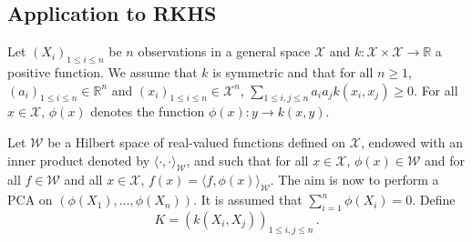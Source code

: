 \documentclass[a4paper,10pt,fleqn]{article}
\newcommand{\eqsp}{\,}
\newcommand{\rset}{\ensuremath{\mathbb{R}}}
\newcommand{\W}{\ensuremath{\mathcal{W}}}
\newcommand{\X}{\ensuremath{\mathcal{X}}}
\newcommand{\1}{\ensuremath{\mathbbm{1}}}
\newcommand{\bfK}{K}
\begin{document}
\subsection*{Application to RKHS}
Let $(X_i)_{1\le i \le n}$ be $n$ observations in a general space $\X$ and $k: \X\times \X \to \rset$ a positive function. We assume that $k$ is symmetric and that for all $n\geqslant 1$, $(a_i)_{1\leqslant i \leqslant n}\in\rset^n$ and $(x_i)_{1\leqslant i \leqslant n}\in\X^n$, $\sum_{1\leqslant i,j \leqslant n}a_ia_j k(x_i,x_j)\geqslant 0$.  For all $x\in\X$, $\phi(x)$ denotes the function $\phi(x): y\to k(x,y)$.

Let $\W$ be a Hilbert space of real-valued functions defined on $\X$, endowed with an inner product denoted by $\langle \cdot,\cdot \rangle_{\W}$, and such that for all $x\in\X$, $\phi(x)\in\W$ and for all $f\in \W$ and all $x\in\X$, $f(x) = \langle f,\phi(x) \rangle_{\W}$. The aim is now to perform a PCA on $(\phi(X_1),\ldots,\phi(X_n))$. It is assumed that $\sum_{i=1}^n \phi(X_i) = 0$. Define
$$
\bfK = \left(k(X_i,X_j)\right)_{1\leqslant i,j \leqslant n}\eqsp.
$$
\end{document}
